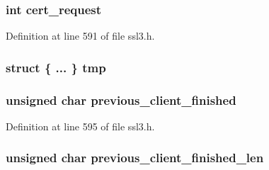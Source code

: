 \subsubsection[{\texorpdfstring{cert\+\_\+request}{cert_request}}]{\setlength{\rightskip}{0pt plus 5cm}int cert\+\_\+request}\hypertarget{structssl3__state__st_aea687a2eb34603cfdf4c9f15f60d9a72}{}\label{structssl3__state__st_aea687a2eb34603cfdf4c9f15f60d9a72}


Definition at line 591 of file ssl3.\+h.

\subsubsection[{\texorpdfstring{tmp}{tmp}}]{\setlength{\rightskip}{0pt plus 5cm}struct \{ ... \}   tmp}\hypertarget{structssl3__state__st_a2abffe9573dedd590dc3622beba1eb3f}{}\label{structssl3__state__st_a2abffe9573dedd590dc3622beba1eb3f}
\subsubsection[{\texorpdfstring{previous\+\_\+client\+\_\+finished}{previous_client_finished}}]{\setlength{\rightskip}{0pt plus 5cm}unsigned char previous\+\_\+client\+\_\+finished}\hypertarget{structssl3__state__st_a8eedab0d7cc59dbba78a6b705bdb9a69}{}\label{structssl3__state__st_a8eedab0d7cc59dbba78a6b705bdb9a69}


Definition at line 595 of file ssl3.\+h.

\subsubsection[{\texorpdfstring{previous\+\_\+client\+\_\+finished\+\_\+len}{previous_client_finished_len}}]{\setlength{\rightskip}{0pt plus 5cm}unsigned char previous\+\_\+client\+\_\+finished\+\_\+len}\hypertarget{structssl3__state__st_ac29982b49b8861113dd5bdcae832080d}{}\label{structssl3__state__st_ac29982b49b8861113dd5bdcae832080d}


